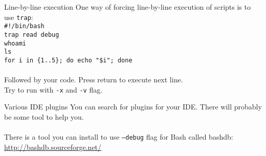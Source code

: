 \documentclass{beamer}
\let\tt\texttt
\begin{document}
\begin{frame}{Line-by-line execution}
    One way of forcing line-by-line execution of scripts is to use \tt{trap}:   \\
    \tt{\#!/bin/bash}       \\
    \tt{trap read debug}    \\
    \tt{whoami}             \\
    \tt{ls}                 \\
    \tt{for i in \{1..5\}; do echo "\$i"; done}                  \\
    \quad   \\
    Followed by your code. Press return to execute next line.   \\
    Try to run with \tt{-x} and \tt{-v} flag.
\end{frame}

\begin{frame}{Various IDE plugins}
    You can search for plugins for your IDE. There will probably be some tool to help you.   \\
    \quad   \\
    There is a tool you can install to use \tt{--debug} flag for Bash called bashdb:    \\
    \url{http://bashdb.sourceforge.net/}
\end{frame}
\end{document}
